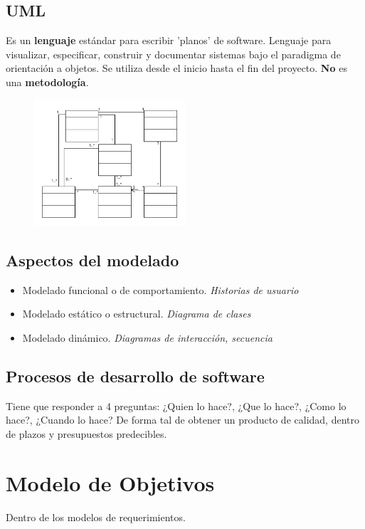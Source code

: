 \documentclass[titlepage,a4paper]{article}
\begin{document}
\subsection{UML}
Es un \textbf{lenguaje} estándar para escribir 'planos' de software. Lenguaje para visualizar, especificar, construir y documentar sistemas bajo el paradigma de orientación a objetos. Se utiliza desde el inicio hasta el fin del proyecto.
\textbf{No} es una \textbf{metodología}.

    \begin{figure}[!htb]
        \centering
        \includegraphics[width=0.5\textwidth]{Imagenes/UML.png}
    \end{figure}

\subsection*{Aspectos del modelado}
    \begin{itemize}
        \item Modelado funcional o de comportamiento. \textit{Historias de usuario}
        \item Modelado estático o estructural. \textit{Diagrama de clases}
        \item Modelado dinámico. \textit{Diagramas de interacción, secuencia}
    \end{itemize}

\subsection{Procesos de desarrollo de software}

Tiene que responder a 4 preguntas: ¿Quien lo hace?, ¿Que lo hace?, ¿Como lo hace?, ¿Cuando lo hace?
De forma tal de obtener un producto de calidad, dentro de plazos y presupuestos predecibles.

\section{Modelo de Objetivos}
Dentro de los modelos de requerimientos.
\end{document}
